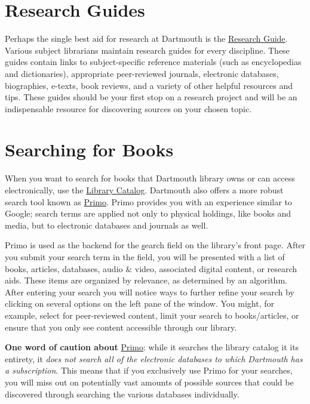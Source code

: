 \section{Research Guides}

Perhaps the single best aid for research at Dartmouth is the
\href{http://researchguides.dartmouth.edu}{Research Guide}. Various subject
librarians maintain research guides for every discipline. These guides contain
links to subject-specific reference materials (such as encyclopedias and
dictionaries),  appropriate peer-reviewed journals, electronic databases,
biographies, e-texts, book reviews, and a variety of other helpful resources and
tips. These guides should be your first stop on a research project and will be
an indispensable resource for discovering sources on your chosen topic.

\section{Searching for Books}

When you want to search for books that Dartmouth library owns or can access
electronically, use the \href{http://libcat.dartmouth.edu/}{Library Catalog}.
Dartmouth also offers a more robust search tool known as
\href{https://search.library.dartmouth.edu/}{Primo}. Primo provides
you with an experience similar to Google; search terms are applied not only to
physical holdings, like books and media, but to electronic databases and journals as well.

Primo is used as the backend for the \href{https://search.library.dartmouth.edu/} search field on the library's front page. After you submit your
search term in the field, you will be presented with a list of books, articles, databases, audio \& video, associated digital content, or research aids. These items are organized by relevance, as determined by an algorithm. After entering your search you will notice ways to further refine your search by clicking on several options on the left pane of the window. You might, for example, select for peer-reviewed content, limit your search to books/articles, or ensure that you only see content accessible through our library.  

\begin{center}
\begin{tcolorbox}[colframe=oyster, coltitle=black, sharp corners, title=\ding{52} Note]
\textbf{One word of caution about}
\href{https://search.library.dartmouth.edu/}{Primo}: while
it searches the library catalog it its entirety, it \emph{does not search all of
the electronic databases to which Dartmouth has a subscription}. This means that
if you exclusively use Primo for your searches, you will miss out on potentially vast amounts of possible sources that could be discovered through searching the various databases individually.
\end{tcolorbox}
\end{center}



